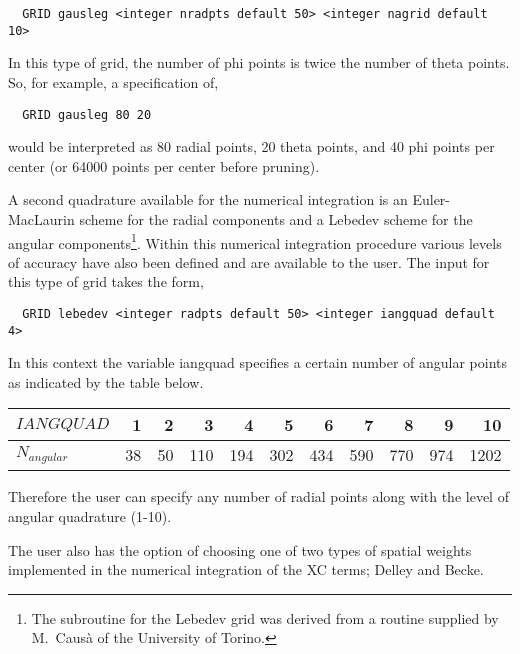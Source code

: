 \begin{verbatim}
  GRID gausleg <integer nradpts default 50> <integer nagrid default 10> 
\end{verbatim}

In this type of grid, the number of phi points is twice the number of
theta points. So, for example, a specification of,
\begin{verbatim}
  GRID gausleg 80 20
\end{verbatim}
would be interpreted as 80 radial points, 20 theta points, and 40
phi points per center (or 64000 points per center before pruning).

A second quadrature available for the numerical integration is an
Euler-Mac\-Laurin scheme for the radial components and a Lebedev
scheme for the angular components\footnote{The subroutine 
for the Lebedev grid was derived from a routine supplied by M.~Caus\`a
of the University of Torino.}.  
Within this numerical integration procedure various levels 
of accuracy have also been defined and are available to the user.  
The input for this type of grid takes the form,
\begin{verbatim}
  GRID lebedev <integer radpts default 50> <integer iangquad default 4> 
\end{verbatim}
In this context the variable iangquad specifies a certain number of
angular points as indicated by the table below.

\begin{center}
\begin{tabular}[right]{|l|r r r r r r r r r r |} \hline
$IANGQUAD$ & 1 & 2 & 3 & 4 & 5 & 6 & 7 & 8 & 9 & 10 \\ \hline
$N_{angular}$ & 38 & 50 & 110 & 194 & 302 & 434 & 590 & 770 & 974 & 1202\\ \hline
\end{tabular}
\end{center}

Therefore the user can specify any number of radial points along with
the level of angular quadrature (1-10).

%

The user also has the option of choosing one of two types of spatial weights
implemented in the numerical integration of the XC terms; Delley and Becke.

